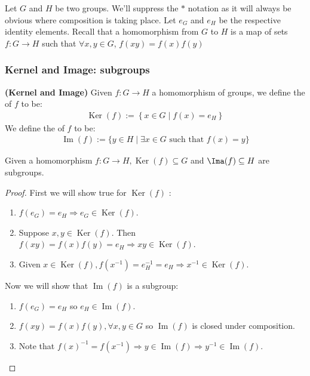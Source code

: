 \documentclass{article}
\newcommand{\bfs}[1]{\textbf{({#1}) }}
\begin{document}
Let $G$ and $H$ be two groups. We'll suppress the $*$ notation as it will always be obvious where composition is taking place. Let $e_{G}$ and $e_{H}$ be the respective identity elements. Recall that a homomorphism from $G$ to $H$ is a map of sets $f: G \rightarrow H$ such that $\forall x, y \in G$, $f(x y)=f(x) f(y)$
\subsubsection{Kernel and Image: subgroups}
\begin{defa}{\bfs{Kernel and Image}}
 Given $f: G \rightarrow H$ a homomorphism of groups, we define the  of $f$ to be:
\begin{align*}
\operatorname{Ker}(f):=\left\{x \in G \mid f(x)=e_{H}\right\}
\end{align*}
We define the  of $f$ to be:
\begin{align*}
\operatorname{Im}(f):=\{y \in H \mid \exists x \in G \text { such that } f(x)=y\}
\end{align*}
\end{defa} 
\begin{lema}
Given a homomorphism $f: G \rightarrow H, \operatorname{Ker}(f) \subseteq G$ and $\Ima(f) \subseteq H$ are subgroups.
\end{lema} 
\begin{proof}
First we will show true for $\operatorname{Ker}(f)$ :
\begin{enumerate}
    \item $f\left(e_{G}\right)=e_{H} \Rightarrow e_{G} \in \operatorname{Ker}(f)$.
    \item  Suppose $x, y \in\operatorname{Ker}(f)$. Then $f(x y)=f(x) f(y)=e_{H} \Rightarrow x y \in \operatorname{Ker}(f)$.
    \item Given $x \in \operatorname{Ker}(f), f\left(x^{-1}\right)=e_{H}^{-1}=e_{H} \Rightarrow x^{-1} \in \operatorname{Ker}(f)$.
\end{enumerate}
Now we will show that $\operatorname{Im}(f)$ is a subgroup:
\begin{enumerate}
    \item $f\left(e_{G}\right)=e_{H}$ so $e_{H} \in \operatorname{Im}(f)$.
    \item $f(x y)=f(x) f(y), \forall x, y \in G$ so $\operatorname{Im}(f)$ is closed under composition.
    \item Note that $f(x)^{-1}=f\left(x^{-1}\right) \Rightarrow y \in \operatorname{Im}(f) \Rightarrow y^{-1} \in \operatorname{Im}(f)$.
\end{enumerate}
\end{proof} 
\end{document}
